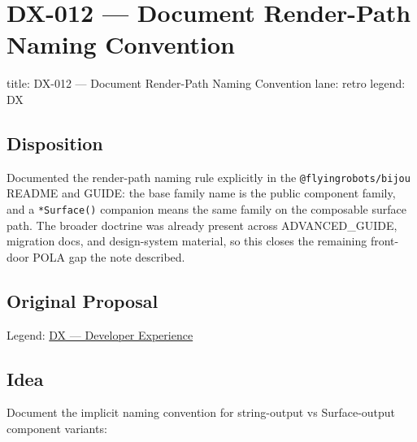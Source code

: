 \chapter{DX-012 --- Document Render-Path Naming Convention}\label{record-344}

\smallskip

\begin{RecordMeta}
title: DX-012 — Document Render-Path Naming Convention
lane: retro
legend: DX

\end{RecordMeta}

\section{Disposition}\label{record-344-disposition}

Documented the render-path naming rule explicitly in the \texttt{@\allowbreak{}f\allowbreak{}l\allowbreak{}y\allowbreak{}i\allowbreak{}n\allowbreak{}g\allowbreak{}r\allowbreak{}o\allowbreak{}b\allowbreak{}o\allowbreak{}t\allowbreak{}s\allowbreak{}/\allowbreak{}b\allowbreak{}i\allowbreak{}j\allowbreak{}o\allowbreak{}u} README and GUIDE: the base family name is the public component family, and a \texttt{*\allowbreak{}S\allowbreak{}u\allowbreak{}r\allowbreak{}f\allowbreak{}a\allowbreak{}c\allowbreak{}e\allowbreak{}(\allowbreak{})} companion means the same family on the composable surface path. The broader doctrine was already present across ADVANCED\_GUIDE, migration docs, and design-system material, so this closes the remaining front-door POLA gap the note described.

\section{Original Proposal}\label{record-344-original-proposal}

Legend: \href{https://github.com/flyingrobots/bijou/blob/1853ad902f6bf219326409e7f743a5a1d6517dbc/docs/method/legends/DX-developer-experience.md}{DX --- Developer Experience}

\section{Idea}\label{record-344-idea}

Document the implicit naming convention for string-output vs Surface-output component variants:

